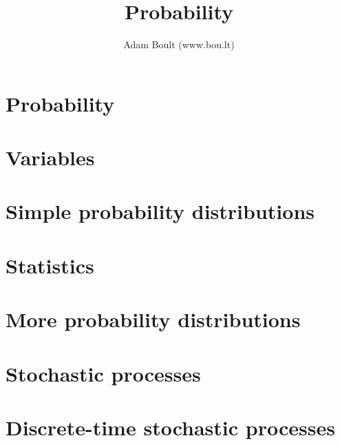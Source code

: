 \documentclass[oneside]{book}
\begin{document}
\author{Adam Boult (www.bou.lt)}
\title{Probability}
\maketitle

\setcounter{tocdepth}{0}
\tableofcontents



\part{Probability}




\part{Variables}







\part{Simple probability distributions}



\part{Statistics}







\part{More probability distributions}




\part{Stochastic processes}









\part{Discrete-time stochastic processes}






\end{document}
